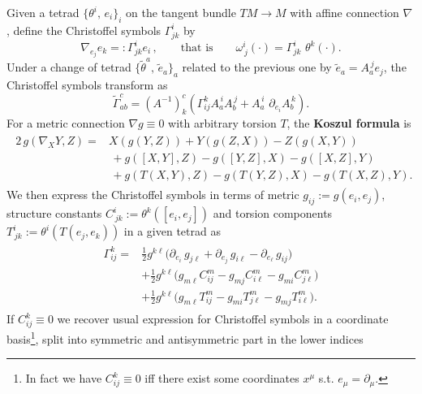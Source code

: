 \begin{mytheorem}
Given a tetrad $\{\theta^i,\, e_i\}_i$ on the tangent bundle $TM\to M$ with affine connection \(\nabla\), define the Christoffel symbols \(\Gamma^i_{jk}\) by
\begin{equation}
    \nabla_{e_j} e_k =: \Gamma^i_{jk} e_i\,,\qquad\text{that is}\qquad \omega^i_{\, j}(\cdot) = \Gamma^i_{ jk}\,\, \theta^k(\cdot).
\end{equation}
Under a change of tetrad \(\{\tilde{\theta}^a,\, \tilde{e}_a\}_a\) related to the previous one by \(\tilde{e}_a = A_a^{\, j} e_j\), the Christoffel symbols transform as
\begin{equation}
    \tilde{\Gamma}^c_{ab} = (A^{-1})^c_k \left( \Gamma^k_{ij} A_a^{\, i} A_b^{\, j} + A_a^{\, i}\,\,\partial_{e_i} A_b^{\, k}  \right).
\end{equation}
%
For a metric connection $\nabla g\equiv 0$ with arbitrary torsion $T$, the \textbf{Koszul formula} is
\begin{align}\label{eq:koszul_formula}
\begin{aligned}
    2\,g(\nabla_X Y, Z) ={}& X\!\left(g(Y,Z)\right) + Y\!\left(g(Z,X)\right) - Z\!\left(g(X,Y)\right)\\
    &\, + g([X,Y],Z) - g([Y,Z],X) - g([X,Z],Y) \\
    & \,+ g\!\left(T(X,Y),Z\right) - g\!\left(T(Y,Z),X\right) - g\!\left(T(X,Z),Y\right).
\end{aligned}
\end{align}
We then express the Christoffel symbols in terms of metric $g_{ij} := g(e_i, e_j)$, structure constants \(C^i_{\, jk}:=\theta^k([e_i,e_j])\) and torsion components \(T^i_{\, jk}:=\theta^i(T(e_j,e_k))\) in a given tetrad as
\begin{align}\label{eq:koszul_formula_cohordinates}
\begin{aligned}
    \Gamma_{ij}^k=&\tfrac{1}{2} g^{k\ell} \Big( \partial_{e_i}\,g_{j \ell} + \partial_{e_j}\,g_{i \ell} - \partial_{e_\ell}\,g_{i j}\Big)\\
    & + \tfrac{1}{2} g^{k\ell} \Big( g_{m \ell} C^m_{ij} - g_{m j} C^m_{i \ell} - g_{m i} C^m_{j \ell} \Big) \\
    & +\tfrac{1}{2} g^{k\ell} \Big( g_{m \ell} T^m_{ij} -g_{m i} T^m_{j \ell} - g_{m j} T^m_{i \ell}  \Big).
\end{aligned}
\end{align}
If $C_{ij}^k\equiv 0$ we recover usual expression for Christoffel symbols in a coordinate basis\footnote{In fact we have $C_{ij}^k\equiv 0$ iff there exist some coordinates $x^\mu$ s.t. $e_\mu=\partial_\mu$.}, split into symmetric and antisymmetric part in the lower indices 

\end{mytheorem}
